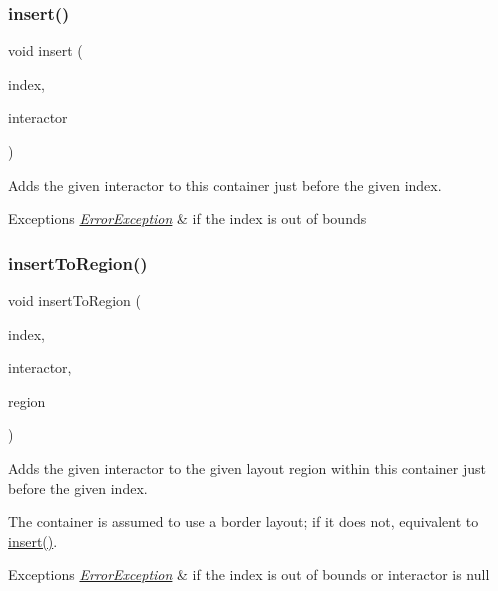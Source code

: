 \subsubsection{\texorpdfstring{insert()}{insert()}\hspace{0.1cm}{\footnotesize\ttfamily [2/2]}}
{\footnotesize\ttfamily void insert (\begin{DoxyParamCaption}\item[{int}]{index,  }\item[{\mbox{\hyperlink{classGInteractor}{G\+Interactor}} \&}]{interactor }\end{DoxyParamCaption})\hspace{0.3cm}{\ttfamily [virtual]}}



Adds the given interactor to this container just before the given index. 


\begin{DoxyExceptions}{Exceptions}
{\em \mbox{\hyperlink{classErrorException}{Error\+Exception}}} & if the index is out of bounds \\
\hline
\end{DoxyExceptions}
\mbox{\label{classGContainer_a1c4b766b059991ad7d084ea03f22f1c5}} 
\subsubsection{\texorpdfstring{insert\+To\+Region()}{insertToRegion()}\hspace{0.1cm}{\footnotesize\ttfamily [1/4]}}
{\footnotesize\ttfamily void insert\+To\+Region (\begin{DoxyParamCaption}\item[{int}]{index,  }\item[{\mbox{\hyperlink{classGInteractor}{G\+Interactor}} $\ast$}]{interactor,  }\item[{\mbox{\hyperlink{classGContainer_a81a01a86de31071a92e6cce0bab9bc4b}{Region}}}]{region }\end{DoxyParamCaption})\hspace{0.3cm}{\ttfamily [virtual]}}



Adds the given interactor to the given layout region within this container just before the given index. 

The container is assumed to use a border layout; if it does not, equivalent to \mbox{\hyperlink{classGContainer_afffb8f789ff9a8466fbae5b846a0ebe7}{insert()}}. 
\begin{DoxyExceptions}{Exceptions}
{\em \mbox{\hyperlink{classErrorException}{Error\+Exception}}} & if the index is out of bounds or interactor is null \\
\hline
\end{DoxyExceptions}
\mbox{\label{classGContainer_adeeb03feb9346a9cf2046427484c20bc}} 
